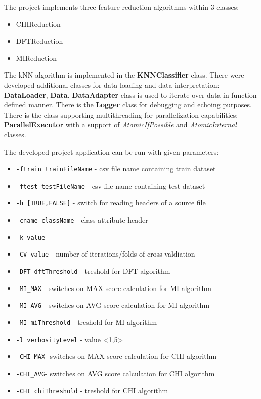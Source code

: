 \documentclass[12pt,a4paper]{report}
\begin{document}
The project implements three feature reduction algorithms within 3 classes:
\begin{itemize}
  \item CHIReduction
  \item DFTReduction
  \item MIReduction
\end{itemize}
The kNN algorithm is implemented in the \textbf{KNNClassifier} class. There were developed additional classes for data loading and data interpretation: \textbf{DataLoader}, \textbf{Data}. \textbf{DataAdapter} class is used to iterate over data in function defined manner. There is the \textbf{Logger} class for debugging and echoing purposes. There is the class supporting multithreading  for parallelization capabilities: \textbf{ParallelExecutor} with a support of \emph{AtomicIfPossible} and \emph{AtomicInternal} classes.

The developed project application can be run with given parameters:
\begin{itemize}
  \item \texttt{-ftrain trainFileName} - csv file name containing train dataset
  \item \texttt{-ftest testFileName} - csv file name containing test dataset
  \item \texttt{-h [TRUE,FALSE]} - switch for reading headers of a source file
  \item \texttt{-cname className} - class attribute header
  \item \texttt{-k value}
  \item \texttt{-CV value} - number of iterations/folds of cross valdiation
  \item \texttt{-DFT dftThreshold} - treshold for DFT algorithm
  \item \texttt{-MI\_MAX} - switches on MAX score calculation for MI algorithm
  \item \texttt{-MI\_AVG} - switches on AVG score calculation for MI algorithm
  \item \texttt{-MI miThreshold} - treshold for MI algorithm
  \item \texttt{-l verbosityLevel}  - value <1,5>
  \item \texttt{-CHI\_MAX}- switches on MAX score calculation for CHI algorithm
  \item \texttt{-CHI\_AVG}- switches on AVG score calculation for CHI algorithm
  \item \texttt{-CHI chiThreshold} - treshold for CHI algorithm
\end{itemize}
\end{document}
